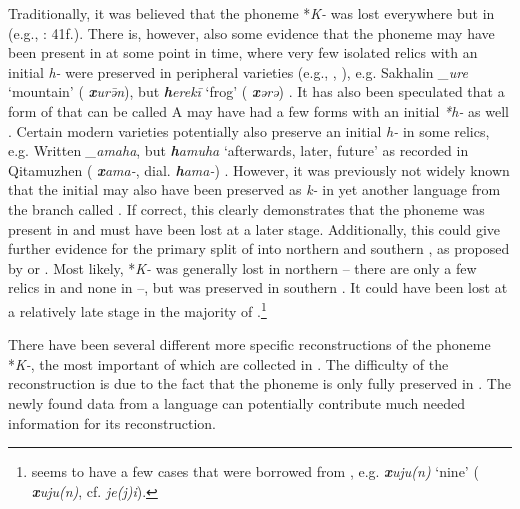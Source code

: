 \documentclass[output=paper,hidelinks]{langscibook}
\begin{document}
Traditionally, it was believed that the phoneme *\textit{K-} was lost everywhere but in  (e.g., \citealt{Benzing1956}: 41f.). There is, however, also some evidence that the phoneme may have been present in  at some point in time, where very few isolated relics with an initial \textit{h-} were preserved in peripheral varieties (e.g., \citealt{Vasilevich1958}, \citealt[581]{Doerfer1973}), e.g. Sakhalin  \textit{\_ure} `mountain' ( \textit{\textbf{x}ur\=ən}), but \textit{\textbf{h}erekī} `frog' ( \textit{\textbf{x}ərə}) \citep[106f.]{BulatovaCotrozzi2004}. It has also been speculated that a form of  that can be called  A \citep{Grube1896,Kiyose1977} may have had a few forms with an initial \textit{*h-} as well  \citep{Kiyose1996,Kiyose2000,Hölzl2017}. Certain modern  varieties potentially also preserve an initial \textit{h-} in some relics, e.g. Written  \textit{\_amaha}, but \textit{\textbf{h}amuha} `afterwards, later, future' as recorded in Qitamuzhen ( \textit{\textbf{x}ama-}, dial.  \textit{\textbf{h}ama-}) \citep{Hölzltoappear}. However, it was previously not widely known that the initial may also have been preserved as \textit{k-} in yet another language from the  branch called  \citep{Hölzl2017,Hölzl2018b}. If correct, this clearly demonstrates that the phoneme was present in  and must have been lost at a later stage. Additionally, this could give further evidence for the primary split of  into northern and southern , as proposed by \citet{Georg2004} or \citet{Janhunen2012}. Most likely, *\textit{K-} was generally lost in northern  -- there are only a few relics in  and none in  --, but was preserved in southern . It could have been lost at a relatively late stage in the majority of .\footnote{ seems to have a few cases that were borrowed from , e.g.  \textit{\textbf{x}uju(n)} `nine' ( \textit{\textbf{x}uju(n)}, cf.  \textit{je(j)i}).}

\begin{sloppypar}
There have been several different more specific reconstructions of the phoneme *\textit{K-}, the most important of which are collected in . The difficulty of the reconstruction is due to the fact that the phoneme is only fully preserved in . The newly found data from a  language can potentially contribute much needed information for its reconstruction.
\end{sloppypar}
\end{document}
